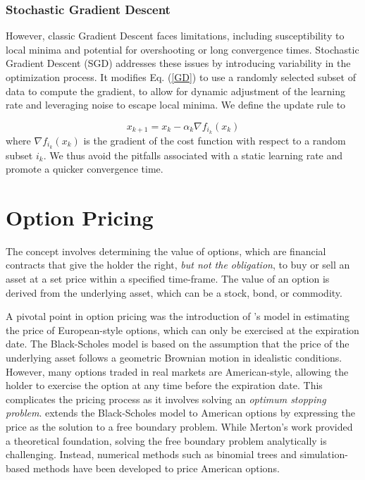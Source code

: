 \documentclass[a4paper]{report}
\begin{document}
\subsubsection{Stochastic Gradient Descent}

However, classic Gradient Descent faces limitations, including susceptibility to local minima and potential for overshooting or long convergence times. Stochastic Gradient Descent (SGD) addresses these issues by introducing variability in the optimization process. It modifies Eq. (\ref{GD}) to use a randomly selected subset of data to compute the gradient, to allow for dynamic adjustment of the learning rate and leveraging noise to escape local minima. We define the update rule to 

\begin{equation}\label{SGD}
x_{k+1} = x_k - \alpha_k \nabla f_{i_k}(x_k)	
\end{equation}
where $\nabla f_{i_k}(x_k)$ is the gradient of the cost function with respect to a random subset $i_k$. We thus avoid the pitfalls associated with a static learning rate and promote a quicker convergence time.

\section{Option Pricing}\label{section:option_pricing}
The concept involves determining the value of options, which are financial contracts that give the holder the right, \textit{but not the obligation}, to buy or sell an asset at a set price within a specified time-frame. The value of an option is derived from the underlying asset, which can be a stock, bond, or commodity. 

A pivotal point in option pricing was the introduction of \citet{black1973pricing}'s model in estimating the price of European-style options, which can only be exercised at the expiration date. The Black-Scholes model is based on the assumption that the price of the underlying asset follows a geometric Brownian motion in idealistic conditions. However, many options traded in real markets are American-style, allowing the holder to exercise the option at any time before the expiration date. This complicates the pricing process as it involves solving an \textit{optimum stopping problem}. \citet{merton1973theory} extends the Black-Scholes model to American options by expressing the price as the solution to a free boundary problem. While Merton's work provided a theoretical foundation, solving the free boundary problem analytically is challenging. Instead, numerical methods such as binomial trees \citep{cox1979option} and simulation-based methods \citep{longstaff2001simulation} have been developed to price American options.
\end{document}
